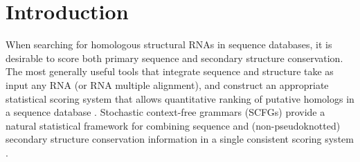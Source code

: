 \section{Introduction}

When searching for homologous structural RNAs in sequence databases,
it is desirable to score both primary sequence and secondary
structure conservation. 
The most generally useful tools that integrate sequence and structure
take as input
any RNA (or RNA multiple alignment), and construct an appropriate
statistical scoring system that allows quantitative ranking of
putative homologs in a sequence database
\citep{Gautheret01,ZhangBafna05,Huang08}.  Stochastic context-free
grammars (SCFGs) provide a natural statistical framework for combining
sequence and (non-pseudoknotted) secondary structure conservation
information in a single consistent scoring system
\citep{Sakakibara94c,Eddy94,Brown00,Durbin98}.

\begin{comment}
When searching for homologous structural RNAs in sequence databases,
it is desirable to score both primary sequence and RNA secondary
structure conservation. Many tools for integrating and scoring RNA
sequence and secondary structure have been developed. Some implement
specialized rules for a specific RNA family
\citep{LoweEddy97,Laslett04,LoweEddy99,Schattner06,Lai03,
Regalia02},
and others use pattern matching methods and expertly designed query
patterns \citep{Macke01}. 
The most general approaches take as input
any RNA (or RNA multiple alignment), and construct an appropriate
statistical scoring system that allows quantitative ranking of
putative homologs in a target sequence database
\citep{Gautheret01,ZhangBafna05,Huang08}.  Stochastic context-free
grammars (SCFGs) provide a natural statistical framework for combining
sequence and (non-pseudoknotted) secondary structure conservation
information in a single consistent scoring system
\citep{Sakakibara94c,Eddy94,Brown00,Durbin98}.
\end{comment}


